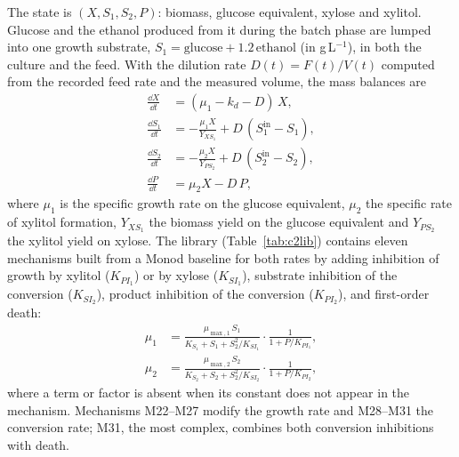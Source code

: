 The state is $(X,S_1,S_2,P)$: biomass, glucose equivalent, xylose and xylitol. Glucose and the ethanol produced from it during the batch phase are lumped into one growth substrate, $S_1=\text{glucose}+1.2\,\text{ethanol}$ (in g\,L$^{-1}$), in both the culture and the feed. With the dilution rate $D(t)=F(t)/V(t)$ computed from the recorded feed rate and the measured volume, the mass balances are
\begin{equation}
\begin{aligned}
\frac{\dd X}{\dd t} &= (\mu_1 - k_d - D)\,X, \\
\frac{\dd S_1}{\dd t} &= -\frac{\mu_1 X}{Y_{XS_1}} + D\,(S_{1}^{\mathrm{in}} - S_1),\\
\frac{\dd S_2}{\dd t} &= -\frac{\mu_2 X}{Y_{PS_2}} + D\,(S_{2}^{\mathrm{in}} - S_2),\\
\frac{\dd P}{\dd t} &= \mu_2 X - D\,P,
\end{aligned}
\label{eq:c2}
\end{equation}
where $\mu_1$ is the specific growth rate on the glucose equivalent, $\mu_2$ the specific rate of xylitol formation, $Y_{XS_1}$ the biomass yield on the glucose equivalent and $Y_{PS_2}$ the xylitol yield on xylose. The library (Table~\ref{tab:c2lib}) contains eleven mechanisms built from a Monod baseline for both rates by adding inhibition of growth by xylitol ($K_{PI_1}$) or by xylose ($K_{SI_1}$), substrate inhibition of the conversion ($K_{SI_2}$), product inhibition of the conversion ($K_{PI_2}$), and first-order death:
\begin{equation}
\begin{aligned}
\mu_1 &= \frac{\mu_{\max,1}\,S_1}{K_{S_1}+S_1+S_2^2/K_{SI_1}}\cdot\frac{1}{1+P/K_{PI_1}},\\
\mu_2 &= \frac{\mu_{\max,2}\,S_2}{K_{S_2}+S_2+S_2^2/K_{SI_2}}\cdot\frac{1}{1+P/K_{PI_2}},
\end{aligned}
\label{eq:c2lib}
\end{equation}
where a term or factor is absent when its constant does not appear in the mechanism. Mechanisms M22--M27 modify the growth rate and M28--M31 the conversion rate; M31, the most complex, combines both conversion inhibitions with death.

